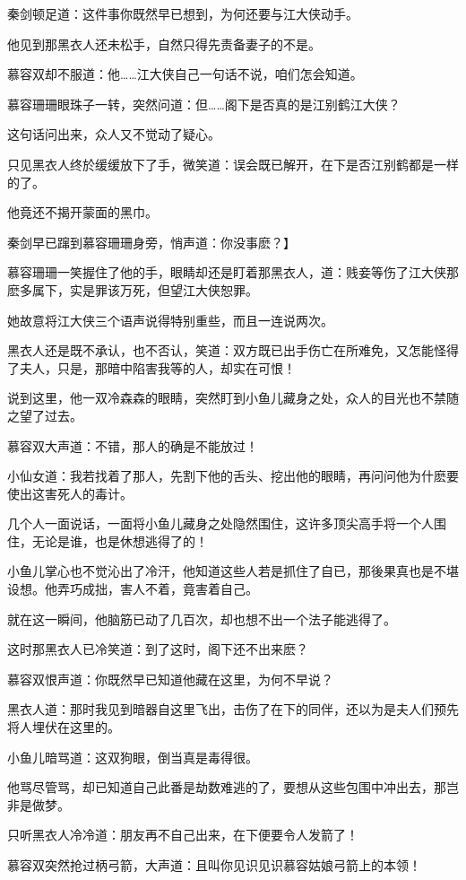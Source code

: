 \documentclass[12pt,oneside]{book}
\begin{document}
秦剑顿足道：这件事你既然早已想到，为何还要与江大侠动手。

他见到那黑衣人还未松手，自然只得先责备妻子的不是。

慕容双却不服道：他\ldots\ldots 江大侠自己一句话不说，咱们怎会知道。

慕容珊珊眼珠子一转，突然问道：但\ldots\ldots 阁下是否真的是江别鹤江大侠？

这句话问出来，众人又不觉动了疑心。

只见黑衣人终於缓缓放下了手，微笑道：误会既已解开，在下是否江别鹤都是一样的了。

他竟还不揭开蒙面的黑巾。

秦剑早已蹿到慕容珊珊身旁，悄声道：你没事麽？】

慕容珊珊一笑握住了他的手，眼睛却还是盯着那黑衣人，道：贱妾等伤了江大侠那麽多属下，实是罪该万死，但望江大侠恕罪。

她故意将江大侠三个语声说得特别重些，而且一连说两次。

黑衣人还是既不承认，也不否认，笑道：双方既已出手伤亡在所难免，又怎能怪得了夫人，只是，那暗中陷害我等的人，却实在可恨！

说到这里，他一双冷森森的眼睛，突然盯到小鱼儿藏身之处，众人的目光也不禁随之望了过去。

慕容双大声道：不错，那人的确是不能放过！

小仙女道：我若找着了那人，先割下他的舌头、挖出他的眼睛，再问问他为什麽要使出这害死人的毒计。

几个人一面说话，一面将小鱼儿藏身之处隐然围住，这许多顶尖高手将一个人围住，无论是谁，也是休想逃得了的！

小鱼儿掌心也不觉沁出了冷汗，他知道这些人若是抓住了自已，那後果真也是不堪设想。他弄巧成拙，害人不着，竟害着自己。

就在这一瞬间，他脑筋已动了几百次，却也想不出一个法子能逃得了。

这时那黑衣人已冷笑道：到了这时，阁下还不出来麽？

慕容双恨声道：你既然早已知道他藏在这里，为何不早说？

黑衣人道：那时我见到暗器自这里飞出，击伤了在下的同伴，还以为是夫人们预先将人埋伏在这里的。

小鱼儿暗骂道：这双狗眼，倒当真是毒得很。

他骂尽管骂，却已知道自己此番是劫数难逃的了，要想从这些包围中冲出去，那岂非是做梦。

只听黑衣人冷冷道：朋友再不自己出来，在下便要令人发箭了！

慕容双突然抢过柄弓箭，大声道：且叫你见识见识慕容姑娘弓箭上的本领！
\end{document}
